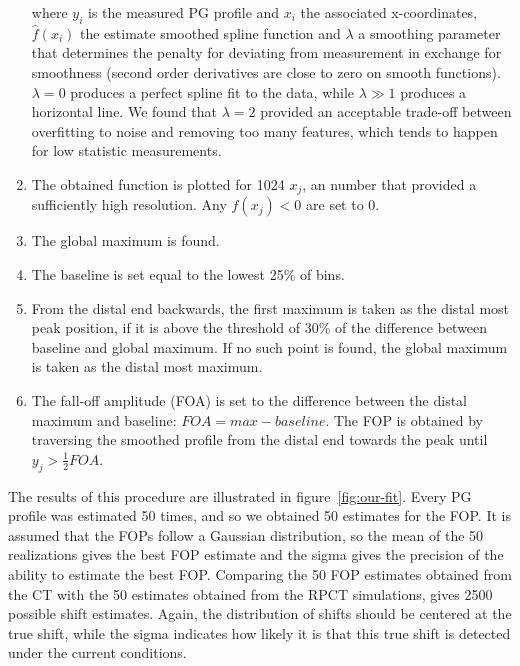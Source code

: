 \documentclass[a4paper,english]{article}
\begin{document}
\begin{appendices}
\begin{enumerate}[noitemsep]
where $y_i$ is the measured PG profile and $x_i$ the associated x-coordinates, $\hat f(x_i)$ the estimate smoothed spline function and $\lambda$ a smoothing parameter that determines the penalty for deviating from measurement in exchange for smoothness (second order derivatives are close to zero on smooth functions). $\lambda = 0$ produces a perfect spline fit to the data, while $\lambda \gg 1$ produces a horizontal line. We found that $\lambda = 2$ provided an acceptable trade-off between overfitting to noise and removing too many features, which tends to happen for low statistic measurements.
\item The obtained function is plotted for 1024 $x_j$, an number that provided a sufficiently high resolution. Any $f(x_j) < 0$ are set to $0$. 
\item The global maximum is found.
\item The baseline is set equal to the lowest 25\% of bins.
\item From the distal end backwards, the first maximum is taken as the distal most peak position, if it is above the threshold of 30\% of the difference between baseline and global maximum. If no such point is found, the global maximum is taken as the distal most maximum.
\item The fall-off amplitude (FOA) is set to the difference between the distal maximum and baseline: $FOA = max-baseline$. The FOP is obtained by traversing the smoothed profile from the distal end towards the peak until $y_j > \frac{1}{2}FOA$.
\end{enumerate}

The results of this procedure are illustrated in figure~\ref{fig:our-fit}. Every PG profile was estimated 50 times, and so we obtained 50 estimates for the FOP. It is assumed that the FOPs follow a Gaussian distribution, so the mean of the 50 realizations gives the best FOP estimate and the sigma gives the precision of the ability to estimate the best FOP. Comparing the 50 FOP estimates obtained from the CT with the 50 estimates obtained from the RPCT simulations, gives 2500 possible shift estimates. Again, the distribution of shifts should be centered at the true shift, while the sigma indicates how likely it is that this true shift is detected under the current conditions.


\end{appendices}
\end{document}

